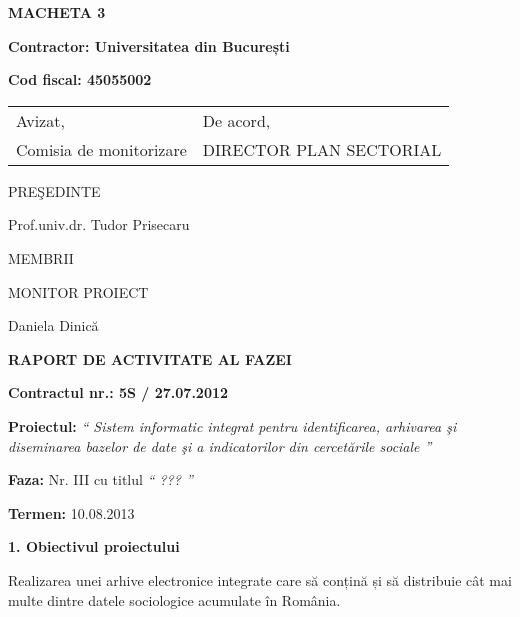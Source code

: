 \documentclass[a4paper]{article}
\title{}
\author{}
\date{2013-04-08}
\begin{document}
{\raggedleft\bfseries
MACHETA 3
\par}

{\bfseries
Contractor: \foreignlanguage{romanian}{Universitatea din Bucure\c{s}ti}}

{\textbf{Cod fiscal: 45055002}


\bigskip


\bigskip


\bigskip


\bigskip

{\bfseries

\begin{tabular}{@{}l l}
Avizat,&De acord,\\
Comisia de monitorizare&DIRECTOR PLAN SECTORIAL\\
\end{tabular}
}

\bigskip

PRE\c{S}EDINTE

Prof.univ.dr. Tudor Prisecaru

\bigskip

MEMBRII

\bigskip

\bigskip

MONITOR PROIECT

Daniela Dinic\u{a}

\bigskip

\bigskip

\bigskip

\bigskip

{\centering\bfseries
RAPORT DE ACTIVITATE AL FAZEI
\par}


\bigskip


\bigskip

{\bfseries
Contractul nr.: 5S / 27.07.2012}

{
\textbf{Proiectul: }
\textit{`` Sistem informatic integrat pentru identificarea, arhivarea \c{s}i diseminarea bazelor de date \c{s}i a indicatorilor din
cercet\u{a}rile sociale ''}}

\bigskip

{
\textbf{Faza: }
Nr. III cu titlul
\textit{`` ??? ''}}

{\textbf{Termen:} 10.08.2013}

\bigskip
{\bfseries 
1. Obiectivul proiectului}

{
\foreignlanguage{english}{Realizarea }\foreignlanguage{romanian}{unei arhive electronice integrate care s\u{a}
con\c{t}in\u{a} \c{s}i s\u{a} distribuie c\^at mai multe dintre datele sociologice acumulate \^in Rom\^ania.}}

}
\end{document}
